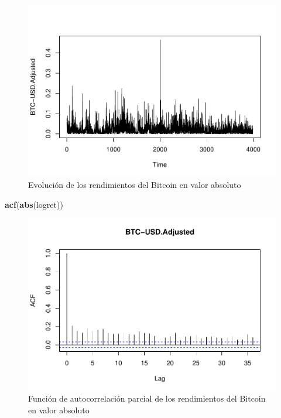 \documentclass[
]{book}
\newenvironment{Shaded}{\begin{snugshade}}{\end{snugshade}}
\newcommand{\FunctionTok}[1]{\textcolor[rgb]{0.13,0.29,0.53}{\textbf{#1}}}
\newcommand{\NormalTok}[1]{#1}
\begin{document}
\begin{figure}

{\centering \includegraphics{Notas-Series-Tiempo_files/figure-latex/fig106-1} 

}

\caption{Evolución de los rendimientos del Bitcoin en valor absoluto}\label{fig:fig106}
\end{figure}

\begin{Shaded}
\begin{Highlighting}[]
\FunctionTok{acf}\NormalTok{(}\FunctionTok{abs}\NormalTok{(logret))}
\end{Highlighting}
\end{Shaded}

\begin{figure}

{\centering \includegraphics{Notas-Series-Tiempo_files/figure-latex/fig107-1} 

}

\caption{Función de autocorrelación parcial de los rendimientos del Bitcoin en valor absoluto}\label{fig:fig107}
\end{figure}
\end{document}
